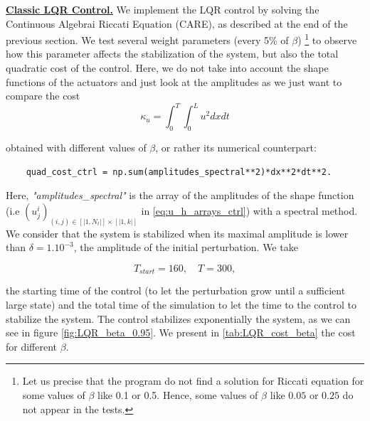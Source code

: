 \documentclass[12pt]{article}
\begin{document}
\underline{\textbf{Classic LQR Control.}} We implement the LQR control by solving the Continuous Algebrai Riccati Equation
(CARE), as described at the end of the previous section. We test several weight parameters (every 5\% of $\beta$)
\footnote{Let us precise that the program do not find a solution for
Riccati equation for some values of $\beta$ like 0.1 or 0.5. Hence, some values of $\beta$ like $0.05$ or $0.25$ do not appear in the tests.} to observe how this parameter affects the stabilization of the system,
but also the total quadratic cost of the control. Here, we do not take into account the shape functions
 of the actuators and just look at the amplitudes as we just want to compare the cost 
\begin{equation}
    \kappa_u = \int_{0}^{T} \int_{0}^{L}u^2 dx dt
\end{equation}

obtained with different values of $\beta$, or rather its numerical counterpart:

\begin{verbatim}
    quad_cost_ctrl = np.sum(amplitudes_spectral**2)*dx**2*dt**2.
\end{verbatim}

Here, \textit{"amplitudes\_spectral"} is the array of the amplitudes of the shape function (i.e $(u_j^i)_{(i, j)\in [|1,N_t|]\times[|1,k|]}$ in \eqref{eq:u_h_arrays_ctrl}) with a spectral method.
\\

We consider that the system is stabilized when its maximal amplitude is lower than $\delta=1.10^{-3}$, the 
amplitude of the initial perturbation. We take 


\begin{equation}
    T_{start} = 160, \quad T=300,
\end{equation}

the starting time of the control (to let the perturbation grow until a sufficient large state) and
the total time of the simulation to let the time to the control to stabilize the system.
The control stabilizes exponentially the system, as we can see in figure \ref{fig:LQR_beta_0.95}. We 
present in \eqref{tab:LQR_cost_beta} the cost for different $\beta$.
\end{document}
